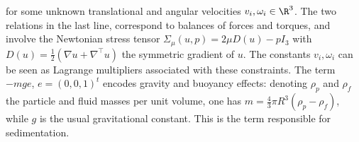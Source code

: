 for some unknown translational and angular velocities $v_i, \omega_i \in \R^3$. The two relations in the last line, correspond to balances of forces and torques, and involve the Newtonian stress tensor $\Sigma_\mu(u,p) = 2\mu D(u) - p I_3$ with $D(u)=\frac{1}{2}(\nabla u + \nabla^\top u)$ the symmetric gradient of $u$. The constants $v_i, \omega_i$ can be seen as Lagrange multipliers associated with these constraints. The term $-mge$, $e = (0,0,1)^t$ encodes gravity and buoyancy effects: denoting $\rho_p$ and $\rho_f$ the particle and fluid masses per unit volume, one has $m = \frac{4}{3} \pi R^3 (\rho_p - \rho_f)$, while $g$ is the usual gravitational constant. This is the term responsible for sedimentation.

